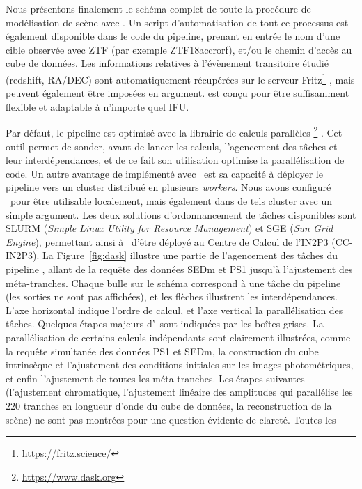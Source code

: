 \documentclass[../main/main.tex]{subfiles}
\begin{document}
Nous présentons finalement le schéma complet de toute la procédure de
modélisation de scène avec \hypergal. Un script d'automatisation de tout
ce processus est également disponible dans le code du pipeline, prenant
en entrée le nom d'une cible observée avec ZTF (par exemple
ZTF18accrorf), et/ou le chemin d'accès au cube de données. Les
informations relatives à l'évènement transitoire étudié (redshift, RA/DEC) sont
automatiquement récupérées sur le serveur
Fritz\footnote{\url{https://fritz.science/}} \citep{skyportal2019,
  duev2019real, Kasliwal_2019, Duev2021}, mais peuvent également être
imposées en argument. \hypergal est conçu pour être suffisamment
flexible et adaptable à n'importe quel IFU.

Par défaut, le pipeline est optimisé avec la librairie de calculs
parallèles \footnote{\url{https://www.dask.org}}
\citep{Dask}. Cet outil permet de sonder, avant de lancer les calculs, l'agencement des
tâches et leur interdépendances, et de ce fait son utilisation optimise la
parallélisation de code. Un autre avantage de  implémenté avec
\hypergal\ est sa capacité à déployer le pipeline vers un cluster
distribué en plusieurs \textit{workers}. Nous avons configuré \hypergal\
pour être utilisable localement, mais également dans de tels cluster
avec un simple argument. Les deux solutions d'ordonnancement de tâches
disponibles sont SLURM (\textit{Simple Linux Utility for Resource
  Management}) et SGE (\textit{Sun Grid Engine}), permettant ainsi à
\hypergal\ d'être déployé au Centre de Calcul de l'IN2P3 (CC-IN2P3). La
Figure~\ref{fig:dask} illustre une partie de l'agencement des tâches du
pipeline \hypergal, allant de la requête des données SEDm et PS1 jusqu'à
l'ajustement des méta-tranches. Chaque bulle sur le schéma correspond à
une tâche du pipeline (les sorties ne sont pas affichées), et les flèches illustrent les
interdépendances. L'axe horizontal indique l'ordre de calcul, et l'axe
vertical la parallélisation des tâches. Quelques étapes majeurs
d'\hypergal\ sont indiquées par les boîtes grises. La parallélisation
de certains calculs indépendants sont clairement illustrées, comme la requête
simultanée des données PS1 et SEDm, la construction du cube intrinsèque
et l'ajustement des conditions initiales sur les images photométriques,
et enfin l'ajustement de toutes les méta-tranches. Les étapes suivantes
(l'ajustement
chromatique, l'ajustement linéaire des amplitudes qui parallélise les
$220$ tranches en longueur d'onde du cube de données, la reconstruction
de la scène) ne
sont pas montrées pour une question évidente de clareté. Toutes les
\end{document}
